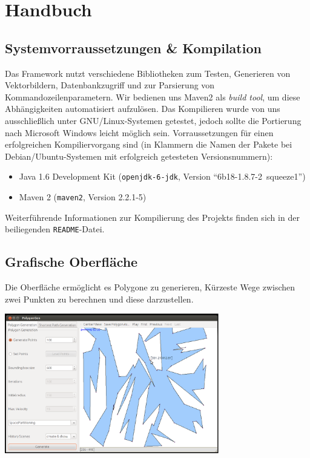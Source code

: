 \section{Handbuch}
  \label{sec:manual}

  \subsection{Systemvorraussetzungen \& Kompilation}

    Das Framework nutzt verschiedene Bibliotheken zum Testen, Generieren von
    Vektorbildern, Datenbankzugriff und zur Parsierung von
    Kommandozeilenparametern. Wir bedienen uns Maven2 als \emph{build tool}, um
    diese Abhängigkeiten automatisiert aufzulösen. Das Kompilieren wurde von
    uns ausschließlich unter GNU/Linux-Systemen getestet, jedoch sollte die
    Portierung nach Microsoft Windows leicht möglich sein. Vorraussetzungen
    für einen erfolgreichen Kompiliervorgang sind (in Klammern die Namen der Pakete
    bei Debian/Ubuntu-Systemen mit erfolgreich getesteten Versionsnummern):

    \begin{itemize}
      \item Java 1.6 Development Kit (\texttt{openjdk-6-jdk}, 
            Version \enquote{6b18-1.8.7-2~squeeze1})
      \item Maven 2 (\texttt{maven2}, Version 2.2.1-5)
    \end{itemize}

    Weiterführende Informationen zur Kompilierung des Projekts finden sich in
    der beiliegenden \texttt{README}-Datei.

  \subsection{Grafische Oberfläche}

    Die Oberfläche ermöglicht es Polygone zu generieren, Kürzeste Wege zwischen
    zwei Punkten zu berechnen und diese darzustellen.\\

    \begin{center}
      \includegraphics[width=0.7\textwidth]{img/GUI.eps}
    \end{center}

